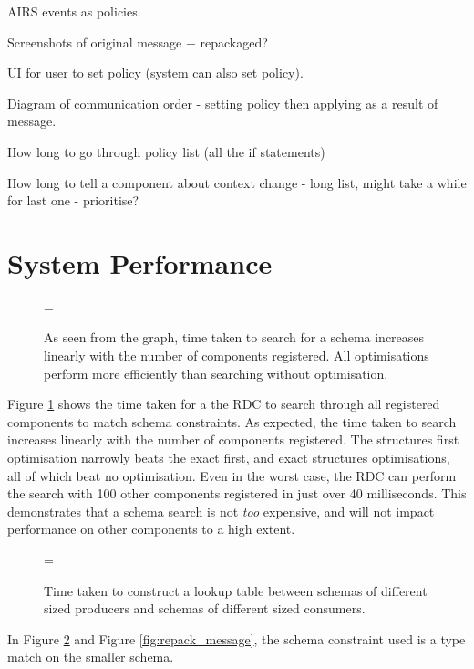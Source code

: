 \documentclass[12pt,twoside,notitlepage]{report}
\begin{document}
AIRS events as policies.

Screenshots of original message + repackaged?

UI for user to set policy (system can also set policy).

Diagram of communication order - setting policy then applying as a result of message.

How long to go through policy list (all the if statements)

How long to tell a component about context change - long list, might take a while for last one - prioritise?

\section{System Performance}

\begin{figure}[tbh]
\epsfxsize=\hsize
\centerline{}
\caption[RDC Search Optimisations]{As seen from the graph, time taken to search for a schema increases linearly with the number of components registered. All optimisations perform more efficiently than searching without optimisation.}
\label{fig:rdc_search_optimisations}
\end{figure}

Figure \ref{fig:rdc_search_optimisations} shows the time taken for a the RDC to search through all registered components to match schema constraints. 
As expected, the time taken to search increases linearly with the number of components registered. 
The structures first optimisation narrowly beats the exact first, and exact structures optimisations, all of which beat no optimisation. 
Even in the worst case, the RDC can perform the search with 100 other components registered in just over 40 milliseconds. 
This demonstrates that a schema search is not {\sl too} expensive, and will not impact performance on other components to a high extent. 

\begin{figure}[tbh]
\epsfxsize=\hsize
\centerline{}
\caption[Construct Lookup Times]{Time taken to construct a lookup table between schemas of different sized producers and schemas of different sized consumers.}
\label{fig:construct_lookup}
\end{figure}

In Figure \ref{fig:construct_lookup} and Figure \ref{fig:repack_message}, the schema constraint used is a type match on the smaller schema. 
\end{document}
